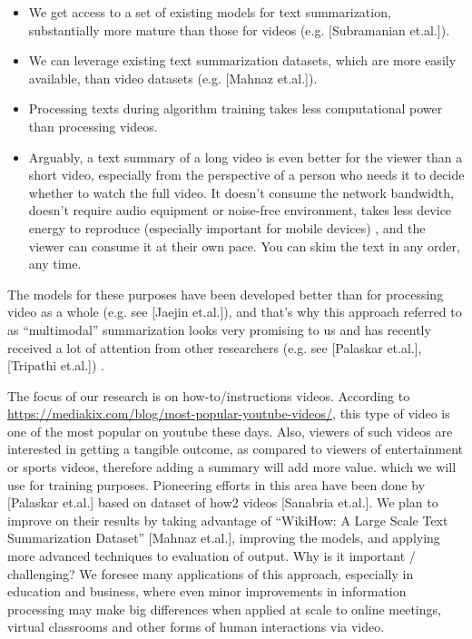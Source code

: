 \documentclass{article}
\begin{document}
\begin{itemize}

\item We get access to a set of existing models for text summarization, substantially more mature than those for videos (e.g. [Subramanian et.al.]).
\item We can leverage existing text summarization datasets, which are more easily available, than video datasets (e.g. [Mahnaz et.al.]).
\item  Processing texts during algorithm training takes less computational power than processing videos.
\item  Arguably, a text summary of a long video is even better for the viewer than a short video, especially from the perspective of a person who needs it to decide whether to watch the full video.  It doesn’t consume the network bandwidth, doesn’t require audio equipment or noise-free environment, takes less device energy to reproduce (especially important for mobile devices) , and the viewer can consume it at their own pace.  You can skim the text in any order, any time. 

\end{itemize}

The models for these purposes have been developed better than for processing video as a whole (e.g. see [Jaejin et.al.]), and that’s why this approach referred to as “multimodal” summarization looks very promising to us and has recently received a lot of attention from other researchers (e.g. see [Palaskar et.al.], [Tripathi et.al.]) . 

The focus of our research is on how-to/instructions videos. According to \url{https://mediakix.com/blog/most-popular-youtube-videos/}, this type of video is one of the most popular on youtube these days.  Also, viewers of such videos are interested in getting a tangible outcome, as compared to viewers of entertainment or sports videos, therefore adding a summary will add more value. which we will use for training purposes. Pioneering efforts in this area have been done by [Palaskar et.al.] based on dataset of how2 videos [Sanabria et.al.]. We plan to improve on their results by taking advantage of “WikiHow: A Large Scale Text Summarization Dataset” [Mahnaz et.al.], improving the models, and applying more advanced techniques to evaluation of output.
Why is it important / challenging?
We foresee many applications of this approach, especially in education and business, where even minor improvements in information processing may make big differences when applied at scale to online meetings, virtual classrooms and other forms of human interactions via video. 
\end{document}
